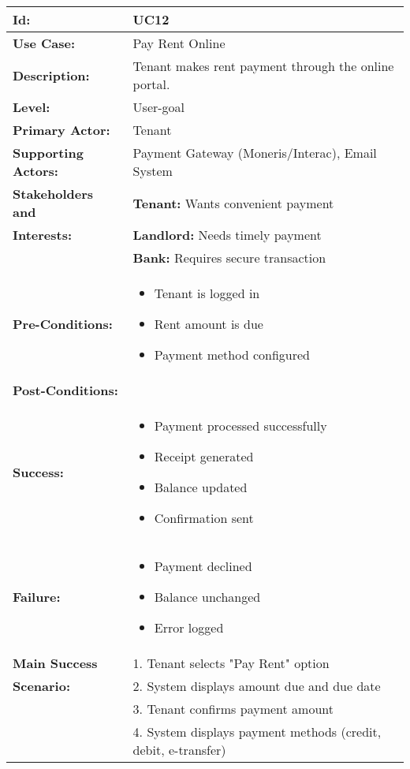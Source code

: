 \documentclass[12pt]{article}
\begin{document}
\begin{longtable}{|p{3cm}|p{11cm}|}
\hline
\textbf{Id:} & UC12 \\
\hline
\textbf{Use Case:} & Pay Rent Online \\
\hline
\textbf{Description:} & Tenant makes rent payment through the online portal. \\
\hline
\textbf{Level:} & User-goal \\
\hline
\textbf{Primary Actor:} & Tenant \\
\hline
\textbf{Supporting Actors:} & Payment Gateway (Moneris/Interac), Email System \\
\hline
\textbf{Stakeholders and} & \textbf{Tenant:} Wants convenient payment \\
\textbf{Interests:} & \textbf{Landlord:} Needs timely payment \\
& \textbf{Bank:} Requires secure transaction \\
\hline
\textbf{Pre-Conditions:} & 
\begin{itemize}
    \item Tenant is logged in
    \item Rent amount is due
    \item Payment method configured
\end{itemize} \\
\hline
\textbf{Post-Conditions:} & \\
\textbf{Success:} & 
\begin{itemize}
    \item Payment processed successfully
    \item Receipt generated
    \item Balance updated
    \item Confirmation sent
\end{itemize} \\
\textbf{Failure:} & 
\begin{itemize}
    \item Payment declined
    \item Balance unchanged
    \item Error logged
\end{itemize} \\
\hline
\textbf{Main Success} & 1. Tenant selects "Pay Rent" option \\
\textbf{Scenario:} & 2. System displays amount due and due date \\
& 3. Tenant confirms payment amount \\
& 4. System displays payment methods (credit, debit, e-transfer) \\

\end{longtable}
\end{document}
